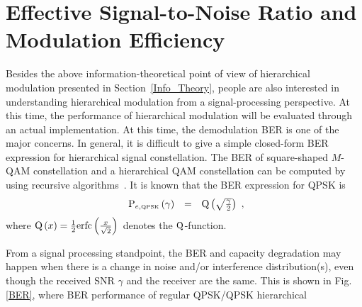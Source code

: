 \documentclass[10pt,fleqn, twocolumn]{IEEEtran}
\begin{document}
\section{Effective Signal-to-Noise Ratio and Modulation Efficiency}
Besides the above information-theoretical point of view of
hierarchical modulation presented in Section~\ref{Info_Theory},
people are also interested in understanding hierarchical
modulation from a signal-processing perspective. At this time, the
performance of hierarchical modulation will be evaluated through
an actual implementation. At this time, the demodulation BER is
one of the major concerns. In general, it is difficult to give a
simple closed-form BER expression for hierarchical signal
constellation. The BER of square-shaped $M$-QAM constellation and
a hierarchical QAM constellation can be computed by using
recursive algorithms~\cite{Vitt03}. It is known that the BER
expression for QPSK is
\begin{equation}
\begin{array}{rcl}
{\rm P}_{e,\mbox{\tiny QPSK}}\left(\gamma\right)&=&{\rm
Q}\left(\sqrt{\frac{\gamma}{2}}\right)
\end{array},\label{BER_QPSK}
\end{equation}
\noindent where ${\rm Q}\left(x\right)=\frac{1}{2}{\rm
erfc}\left(\frac{x}{\sqrt{2}}\right)$ denotes the $\rm
Q$-function.
\begin{figure} 
\end{figure}
From a signal processing standpoint, the BER and capacity
degradation may happen when there is a change in noise and/or
interference distribution(s), even though the received SNR
$\gamma$ and the receiver are the same. This is shown in Fig.
\ref{BER}, where BER performance of regular QPSK/QPSK hierarchical
\end{document}
